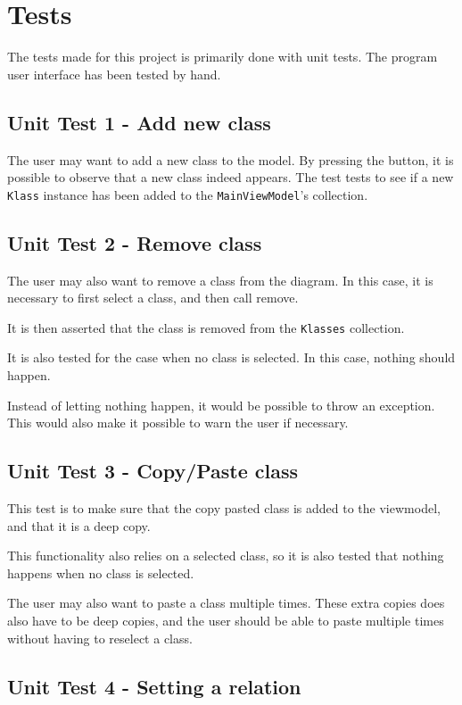 \section{Tests}

The tests made for this project is primarily done with unit
tests. The program user interface has been tested by hand.

\subsection{Unit Test 1 - Add new class}

The user may want to add a new class to the model. By pressing the button, it is
possible to observe that a new class indeed appears. The test tests to see if a
new \texttt{Klass} instance has been added to the \texttt{MainViewModel}'s
collection.

\subsection{Unit Test 2 - Remove class}

The user may also want to remove a class from the diagram. In this case, it is
necessary to first select a class, and then call remove.

It is then asserted that the class is removed from the \texttt{Klasses}
collection.

It is also tested for the case when no class is selected. In this case, nothing
should happen.

Instead of letting nothing happen, it would be possible to throw an exception.
This would also make it possible to warn the user if necessary.

\subsection{Unit Test 3 - Copy/Paste class}

This test is to make sure that the copy pasted class is added to the viewmodel,
and that it is a deep copy.

This functionality also relies on a selected class, so it is also tested that
nothing happens when no class is selected.

The user may also want to paste a class multiple times. These extra copies does
also have to be deep copies, and the user should be able to paste multiple times
without having to reselect a class.


\subsection{Unit Test 4 - Setting a relation}

